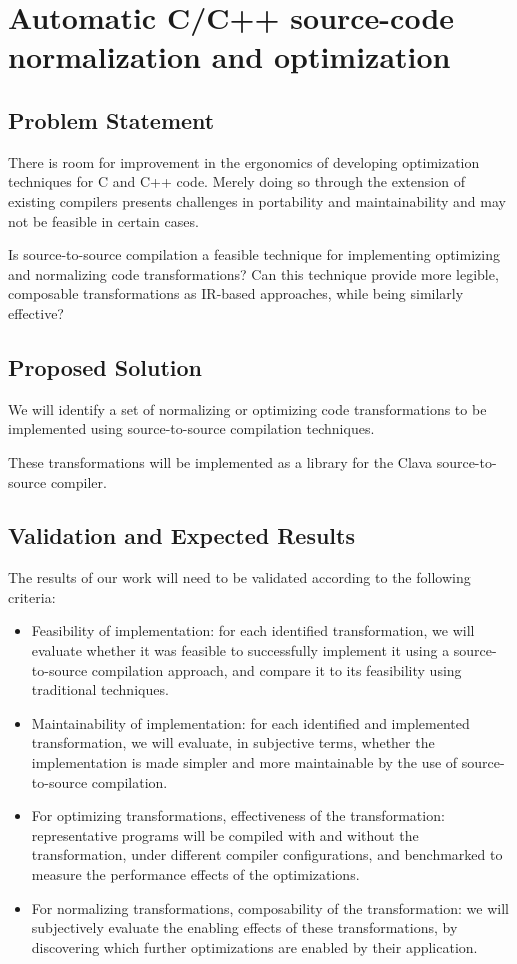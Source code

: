 \chapter{Automatic C/C++ source-code normalization and optimization} \label{chap:stmt}

\section{Problem Statement}

There is room for improvement in the ergonomics of developing optimization techniques for C and C++ code. Merely doing so through the extension of existing compilers presents challenges in portability and maintainability and may not be feasible in certain cases.

Is source-to-source compilation a feasible technique for implementing optimizing and normalizing code transformations? Can this technique provide more legible, composable transformations as IR-based approaches, while being similarly effective?

\section{Proposed Solution}

We will identify a set of normalizing or optimizing code transformations to be implemented using source-to-source compilation techniques.

These transformations will be implemented as a library for the Clava source-to-source compiler.

\section{Validation and Expected Results}

The results of our work will need to be validated according to the following criteria:

\begin{itemize}
    \item Feasibility of implementation: for each identified transformation, we will evaluate whether it was feasible to successfully implement it using a source-to-source compilation approach, and compare it to its feasibility using traditional techniques.
    \item Maintainability of implementation: for each identified and implemented transformation, we will evaluate, in subjective terms, whether the implementation is made simpler and more maintainable by the use of source-to-source compilation.
    \item For optimizing transformations, effectiveness of the transformation: representative programs will be compiled with and without the transformation, under different compiler configurations, and benchmarked to measure the performance effects of the optimizations.
    \item For normalizing transformations, composability of the transformation: we will subjectively evaluate the enabling effects of these transformations, by discovering which further optimizations are enabled by their application.
\end{itemize}

